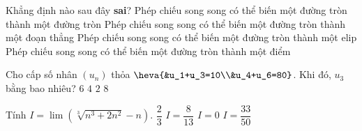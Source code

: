 \begin{ex}%
	Khẳng định nào sau đây \textbf{sai}?
	\choice
	{Phép chiếu song song có thể biến một đường tròn thành một đường tròn}
	{Phép chiếu song song có thể biến một đường tròn thành một đoạn thẳng}
	{Phép chiếu song song có thể biến một đường tròn thành một elip}
	{\True Phép chiếu song song có thể biến một đường tròn thành một điểm}
\end{ex}

\begin{ex}%
	Cho cấp số nhân $(u_n)$ thỏa $\heva{&u_1+u_3=10\\&u_4+u_6=80}$. Khi đó, $u_3$ bằng bao nhiêu?
	\choice
	{$6$}
	{$4$}
	{$2$}
	{\True $8$}
\end{ex}

\begin{ex}%
	Tính $I=\lim \left( \sqrt[3]{n^3+2n^2}-n\right) $.
	\choice
	{\True $\dfrac{2}{3}$}
	{$I=\dfrac{8}{13}$}
	{$I=0$}
	{$I=\dfrac{33}{50}$}
\end{ex}


